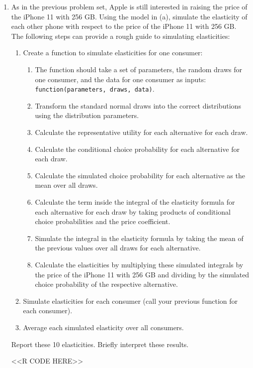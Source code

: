 \documentclass[11pt,letterpaper]{article}
\begin{document}
\begin{enumerate}[label=\alph*., leftmargin=*]
	\item As in the previous problem set, Apple is still interested in raising the price of the iPhone 11 with 256 GB. Using the model in (a), simulate the elasticity of each other phone with respect to the price of the iPhone 11 with 256 GB. The following steps can provide a rough guide to simulating elasticities:
	\begin{enumerate}[label=\Roman*.]
		\item Create a function to simulate elasticities for one consumer:
		\begin{enumerate}[label=\roman*.]
			\item The function should take a set of parameters, the random draws for one consumer, and the data for one consumer as inputs: \texttt{function(parameters, draws, data)}.
			\item Transform the standard normal draws into the correct distributions using the distribution parameters.
			\item Calculate the representative utility for each alternative for each draw.
			\item Calculate the conditional choice probability for each alternative for each draw.
			\item Calculate the simulated choice probability for each alternative as the mean over all draws.
			\item Calculate the term inside the integral of the elasticity formula for each alternative for each draw by taking products of conditional choice probabilities and the price coefficient.
			\item Simulate the integral in the elasticity formula by taking the mean of the previous values over all draws for each alternative.
			\item Calculate the elasticities by multiplying these simulated integrals by the price of the iPhone 11 with 256 GB and dividing by the simulated choice probability of the respective alternative.
		\end{enumerate}
		\item Simulate elasticities for each consumer (call your previous function for each consumer).
		\item Average each simulated elasticity over all consumers.
	\end{enumerate}
	Report these 10 elasticities. Briefly interpret these results.

	<<R CODE HERE>>


\end{enumerate}
\end{document}
